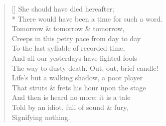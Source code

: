 \documentclass[MAIN]{subfiles}
\begin{document}
\settowidth{\versewidth}{The way to dusty death. Out, out, brief candle!}
\begin{verse}[\versewidth]
She should have died hereafter;\\*
There would have been a time for such a word.\\
Tomorrow \& tomorrow \& tomorrow,\\
Creeps in this petty pace from day to day\\
To the last syllable of recorded time,\\
And all our yesterdays have lighted fools\\
The way to dusty death. Out, out, brief candle!\\
Life's but a walking shadow, a poor player\\
That struts \& frets his hour upon the stage\\
And then is heard no more: it is a tale\\
Told by an idiot, full of sound \& fury,\\
Signifying nothing.
\end{verse}
\end{document}

